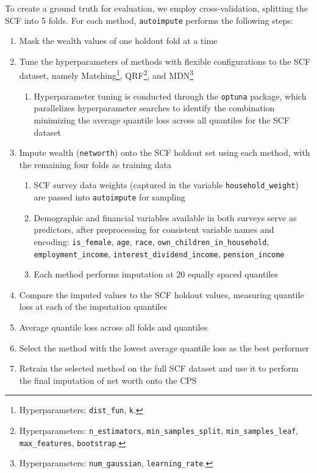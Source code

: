 To create a ground truth for evaluation, we employ cross-validation, splitting the SCF into 5 folds. For each method, \texttt{autoimpute} performs the following steps:

\begin{enumerate}
    \item Mask the wealth values of one holdout fold at a time

    \item Tune the hyperparameters of methods with flexible configurations to the SCF dataset, namely Matching\footnote{Hyperparameters: \texttt{dist\_fun}, \texttt{k}.}, QRF\footnote{Hyperparameters: \texttt{n\_estimators}, \texttt{min\_samples\_split}, \texttt{min\_samples\_leaf}, \texttt{max\_features}, \texttt{bootstrap}.}, and MDN\footnote{Hyperparameters: \texttt{num\_gaussian}, \texttt{learning\_rate}.}
    \begin{enumerate}
        \item Hyperparameter tuning is conducted through the \texttt{optuna} package, which parallelizes hyperparameter searches to identify the combination minimizing the average quantile loss across all quantiles for the SCF dataset
    \end{enumerate}

    \item Impute wealth (\texttt{networth}) onto the SCF holdout set using each method, with the remaining four folds as training data
    \begin{enumerate}
        \item SCF survey data weights (captured in the variable \texttt{household\_weight}) are passed into \texttt{autoimpute} for sampling
        \item Demographic and financial variables available in both surveys serve as predictors, after preprocessing for consistent variable names and encoding: \texttt{is\_female}, \texttt{age}, \texttt{race}, \texttt{own\_\allowbreak{}children\_\allowbreak{}in\_\allowbreak{}household}, \texttt{employment\_\allowbreak{}income}, \texttt{interest\_\allowbreak{}dividend\_\allowbreak{}income}, \texttt{pension\_\allowbreak{}income}
        \item Each method performs imputation at 20 equally spaced quantiles
    \end{enumerate}

    \item Compare the imputed values to the SCF holdout values, measuring quantile loss at each of the imputation quantiles

    \item Average quantile loss across all folds and quantiles

    \item Select the method with the lowest average quantile loss as the best performer

    \item Retrain the selected method on the full SCF dataset and use it to perform the final imputation of net worth onto the CPS
\end{enumerate}

